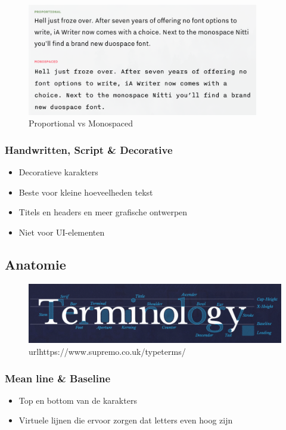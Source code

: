 \documentclass{article}
\begin{document}
\begin{figure}[H]
    \includegraphics[width=0.9\textwidth]{img/Screenshot_20200224_085759.png}
    \caption{Proportional vs Monospaced}
\end{figure}




\subsubsection{Handwritten, Script \& Decorative}
\begin{itemize}
    \item Decoratieve karakters
    \item Beste voor kleine hoeveelheden tekst
    \item Titels en headers en meer grafische ontwerpen
    \item Niet voor UI-elementen
\end{itemize}

\subsection{Anatomie}

\begin{figure}[H]
    \includegraphics[width=\textwidth]{img/Screenshot_20200224_090556.png}
    \caption{url{https://www.supremo.co.uk/typeterms/}}
\end{figure}

\subsubsection{Mean line \& Baseline}
\begin{itemize}
    \item Top en bottom van de karakters
    \item Virtuele lijnen die ervoor zorgen dat letters even hoog zijn
\end{itemize}
\end{document}
